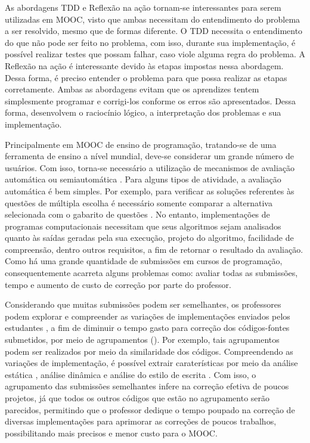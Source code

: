 	As abordagens \acl{TDD} e Reflexão na ação tornam-se interessantes para serem
	utilizadas em \acl{MOOC}, visto que ambas necessitam do entendimento do problema
	a ser resolvido, mesmo que de formas diferente. O \acl{TDD} necessita o entendimento
	do que não pode ser feito no problema, com isso, durante sua implementação, é
	possível realizar testes que possam falhar, caso viole alguma regra do problema.
	A Reflexão na ação é interessante devido às etapas impostas nessa abordagem.
	Dessa forma, é preciso entender o problema para que possa realizar as etapas
	corretamente. Ambas as abordagens evitam que os aprendizes tentem simplesmente
	programar e corrigi-los conforme os erros são apresentados. Dessa forma, desenvolvem
	o raciocínio lógico, a interpretação dos problemas e sua implementação.
	
	Principalmente em \acs{MOOC} de ensino de programação, tratando-se de uma ferramenta de
	ensino a nível mundial, deve-se considerar um grande número de usuários. Com isso,
	torna-se necessário a utilização de mecanismos de avaliação automática ou
	semiautomática \cite{schmidt2013producing}. Para alguns tipos de atividade, a
	avaliação automática é bem simples. Por exemplo, para verificar as soluções
	referentes às questões de múltipla escolha é necessário somente comparar a
	alternativa selecionada com o gabarito de questões \cite{alario2013analysing}. No
	entanto, implementações de programas computacionais necessitam que seus algoritmos
	sejam analisados quanto às saídas geradas pela sua execução, projeto do algoritmo,
	facilidade de compreensão, dentro outros requisitos, a fim de retornar o resultado
	da avaliação. Como há uma grande quantidade de submissões em cursos de programação,
	consequentemente acarreta alguns problemas como: avaliar todas as submissões, tempo
	e aumento de custo de correção por parte do professor.
	
	
	
	Considerando que muitas submissões podem ser semelhantes, os professores podem explorar
	e compreender as variações de implementações enviados pelos estudantes \cite{Yin:2015}, a fim de diminuir
	o tempo gasto para correção dos códigos-fontes submetidos, por meio de agrupamentos
	(). Por exemplo, tais agrupamentos podem ser realizados por meio
	da similaridade dos códigos. Compreendendo as variações de implementação, é possível
	extrair caraterísticas por meio da análise estática \cite{Yin:2015,Glassman:2014,Taherkhani:2012},
	análise dinâmica \cite{Glassman:2015} e análise do estilo de escrita \cite{Wei2015}.
	Com	isso, o agrupamento das submissões semelhantes infere na correção efetiva de
	poucos projetos, já que todos os outros códigos que estão no agrupamento serão
	parecidos, permitindo que o professor dedique o tempo poupado na correção de diversas
	implementações para aprimorar as correções de poucos trabalhos, possibilitando
	 mais precisos e menor custo para o \acs{MOOC}.
	
